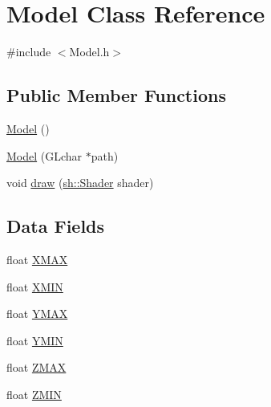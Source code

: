 \hypertarget{classModel}{}\section{Model Class Reference}
\label{classModel}


{\ttfamily \#include $<$Model.\+h$>$}

\subsection*{Public Member Functions}
\begin{DoxyCompactItemize}
\item 
\hyperlink{classModel_ae3b375de5f6df4faf74a95d64748e048}{Model} ()
\item 
\hyperlink{classModel_ac1aaf3ae95e438c200eb3dfcb4a22073}{Model} (G\+Lchar $\ast$path)
\item 
void \hyperlink{classModel_aeb5a81fc1282f805ebbc591c2b03aa0a}{draw} (\hyperlink{classsh_1_1Shader}{sh\+::\+Shader} shader)
\end{DoxyCompactItemize}
\subsection*{Data Fields}
\begin{DoxyCompactItemize}
\item 
float \hyperlink{classModel_a887214a8f563973cb0372e2208434604}{X\+M\+AX}
\item 
float \hyperlink{classModel_aa82ab530b0a822fbaadb1261e6aee6da}{X\+M\+IN}
\item 
float \hyperlink{classModel_a53e3a94533cc9161cdfd9c4a689d167f}{Y\+M\+AX}
\item 
float \hyperlink{classModel_a8cebe48c5f510c12e78d6f343ad78834}{Y\+M\+IN}
\item 
float \hyperlink{classModel_a85b8f4656dc00fabded57052410979c1}{Z\+M\+AX}
\item 
float \hyperlink{classModel_abaee6b7a00cb309bf646b5aaaa39f7d5}{Z\+M\+IN}
\end{DoxyCompactItemize}
